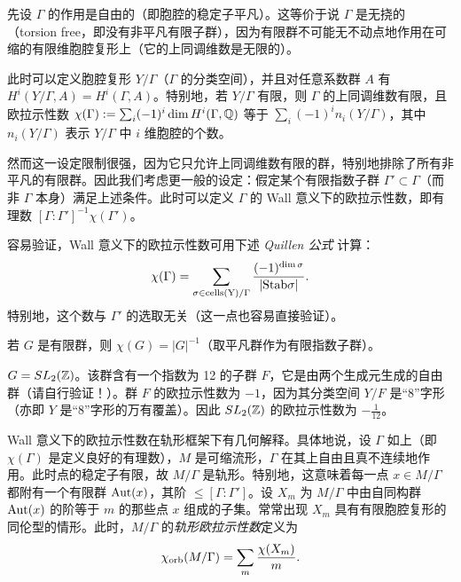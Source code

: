 先设 $\Gamma$ 的作用是自由的（即胞腔的稳定子平凡）。这等价于说 $\Gamma$ 是无挠的（torsion free，即没有非平凡有限子群），因为有限群不可能无不动点地作用在可缩的有限维胞腔复形上（它的上同调维数是无限的）。

此时可以定义胞腔复形 $Y/\Gamma$（$\Gamma$ 的分类空间），并且对任意系数群 $A$ 有 $H^i(Y/\Gamma,A)=H^i(\Gamma,A)$。特别地，若 $Y/\Gamma$ 有限，则 $\Gamma$ 的上同调维数有限，且欧拉示性数 $\chi(\Gamma):=\sum_i (-1)^i\dim H^i(\Gamma,\Bbb Q)$ 等于 $\sum_i (-1)^in_i(Y/\Gamma)$，其中 $n_i(Y/\Gamma)$ 表示 $Y/\Gamma$ 中 $i$ 维胞腔的个数。

然而这一设定限制很强，因为它只允许上同调维数有限的群，特别地排除了所有非平凡的有限群。因此我们考虑更一般的设定：假定某个有限指数子群 $\Gamma'\subset \Gamma$（而非 $\Gamma$ 本身）满足上述条件。此时可以定义 $\Gamma$ 的 Wall 意义下的欧拉示性数，即有理数 $[\Gamma:\Gamma']^{-1}\chi(\Gamma')$。

容易验证，Wall 意义下的欧拉示性数可用下述 \emph{Quillen 公式} 计算：
$$
\chi(\Gamma)=\sum_{\sigma\in {\rm cells(Y)}/\Gamma}\frac{(-1)^{\dim
    \sigma}}{|{\rm Stab}\sigma|}.
$$
特别地，这个数与 $\Gamma'$ 的选取无关（这一点也容易直接验证）。

\begin{example} 若 $G$ 是有限群，则 $\chi(G)=|G|^{-1}$（取平凡群作为有限指数子群）。
\end{example}

\begin{example} $G=SL_2(\Bbb Z)$。该群含有一个指数为 12 的子群 $F$，它是由两个生成元生成的自由群（请自行验证！）。群 $F$ 的欧拉示性数为 $-1$，因为其分类空间 $Y/F$ 是“8”字形（亦即 $Y$ 是“8”字形的万有覆盖）。因此 $SL_2(\Bbb Z)$ 的欧拉示性数为 $-\frac{1}{12}$。
\end{example}

Wall 意义下的欧拉示性数在轨形框架下有几何解释。具体地说，设 $\Gamma$ 如上（即 $\chi(\Gamma)$ 是定义良好的有理数），$M$ 是可缩流形，$\Gamma$ 在其上自由且真不连续地作用。此时点的稳定子有限，故 $M/\Gamma$ 是轨形。特别地，这意味着每一点 $x\in M/\Gamma$ 都附有一个有限群 ${\rm Aut}(x)$，其阶 $\le [\Gamma:\Gamma']$。设 $X_m$ 为 $M/\Gamma$ 中由自同构群 ${\rm Aut}(x)$ 的阶等于 $m$ 的那些点 $x$ 组成的子集。常常出现 $X_m$ 具有有限胞腔复形的同伦型的情形。此时，$M/\Gamma$ 的\emph{轨形欧拉示性数}定义为
$$
\chi_{\rm orb}(M/\Gamma)=\sum_m\frac{\chi(X_m)}{m}.
$$

